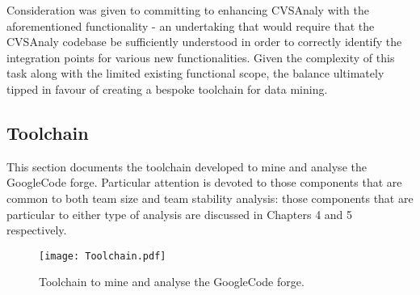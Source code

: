 Consideration was given to committing to enhancing CVSAnaly with the aforementioned functionality - an undertaking that would require that the CVSAnaly codebase be sufficiently understood in order to correctly identify the integration points for various new functionalities. Given the complexity of this task along with the limited existing functional scope, the balance ultimately tipped in favour of creating a bespoke toolchain for data mining. 

\subsection{Toolchain}
This section documents the toolchain developed to mine and analyse the GoogleCode forge. Particular attention is devoted to those components that are common to both team size and team stability analysis: those components that are particular to either type of analysis are discussed in Chapters 4 and 5 respectively.

\begin{figure}[htbp!] 
\centering    
\texttt{[image: Toolchain.pdf]}
\caption{Toolchain to mine and analyse the GoogleCode forge.}
\label{fig:Toolchain}
\end{figure}

